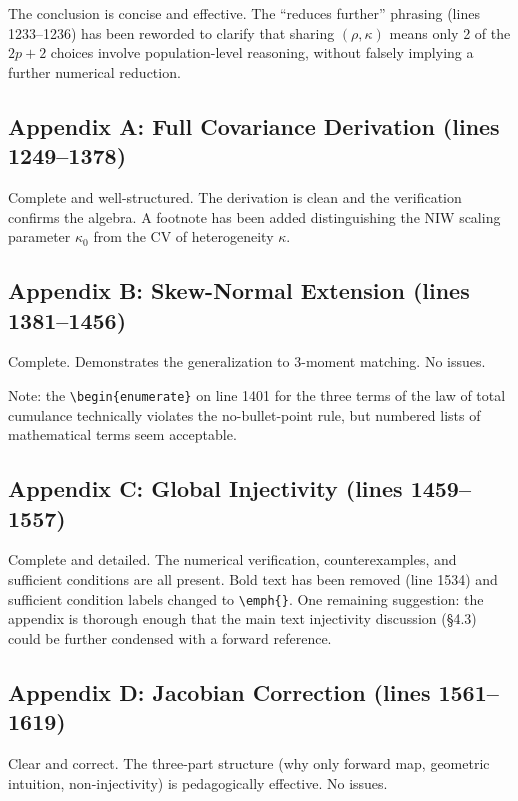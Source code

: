 \documentclass[12pt,a4paper]{article}
\begin{document}
The conclusion is concise and effective. The ``reduces further'' phrasing
(lines 1233--1236) has been reworded to clarify that sharing $(\rho, \kappa)$
means only 2 of the $2p+2$ choices involve population-level reasoning, without
falsely implying a further numerical reduction.


\subsection{Appendix A: Full Covariance Derivation (lines 1249--1378)}

Complete and well-structured. The derivation is clean and the verification
confirms the algebra. A footnote has been added distinguishing the NIW scaling
parameter $\kappa_0$ from the CV of heterogeneity $\kappa$.

\subsection{Appendix B: Skew-Normal Extension (lines 1381--1456)}

Complete. Demonstrates the generalization to 3-moment matching. No issues.

Note: the \verb|\begin{enumerate}| on line 1401 for the three terms of the law
of total cumulance technically violates the no-bullet-point rule, but numbered
lists of mathematical terms seem acceptable.

\subsection{Appendix C: Global Injectivity (lines 1459--1557)}

Complete and detailed. The numerical verification, counterexamples, and
sufficient conditions are all present. Bold text has been removed (line 1534)
and sufficient condition labels changed to \verb|\emph{}|. One remaining
suggestion: the appendix is thorough enough that the main text injectivity
discussion (\S4.3) could be further condensed with a forward reference.


\subsection{Appendix D: Jacobian Correction (lines 1561--1619)}

Clear and correct. The three-part structure (why only forward map, geometric
intuition, non-injectivity) is pedagogically effective. No issues.
\end{document}

